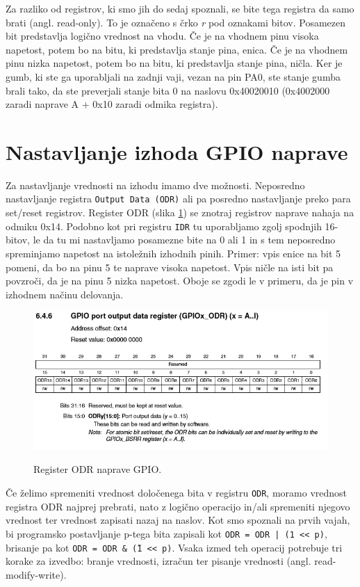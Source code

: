\documentclass[12pt,letterpaper]{article}
\begin{document}
Za razliko od registrov, ki smo jih do sedaj spoznali, se bite tega registra da samo brati (angl. read-only). To je označeno s črko \textit{r} pod oznakami bitov. Posamezen bit predstavlja logično vrednost na vhodu. Če je na vhodnem pinu visoka napetost, potem bo na bitu, ki predstavlja stanje pina, enica. Če je na vhodnem pinu nizka napetost, potem bo na bitu, ki predstavlja stanje pina, ničla. Ker je gumb, ki ste ga uporabljali na zadnji vaji, vezan na pin PA0, ste stanje gumba brali tako, da ste preverjali stanje bita 0 na naslovu 0x40020010 (0x4002000 zaradi naprave A + 0x10 zaradi odmika registra).


\section*{Nastavljanje izhoda GPIO naprave}

Za nastavljanje vrednosti na izhodu imamo dve možnosti. Neposredno nastavljanje registra \texttt{Output Data (ODR)} ali pa posredno nastavljanje preko para set/reset registrov. Register ODR (slika \ref{odr}) se znotraj registrov naprave nahaja na odmiku 0x14. Podobno kot pri registru \texttt{IDR} tu uporabljamo zgolj spodnjih 16-bitov, le da tu mi nastavljamo posamezne bite na 0 ali 1 in s tem neposredno spreminjamo napetost na istoležnih izhodnih pinih. Primer: vpis enice na bit 5 pomeni, da bo na pinu 5 te naprave visoka napetost. Vpis ničle na isti bit pa povzroči, da je na pinu 5 nizka napetost. Oboje se zgodi le v primeru, da je pin v izhodnem načinu delovanja.

\begin{figure}[ht!]
  \centering
  \caption{Register ODR naprave GPIO.}
  \includegraphics[width=350pt]{images/vaja3/odr.png}
  \label{odr}
\end{figure}

Če želimo spremeniti vrednost določenega bita v registru \texttt{ODR}, moramo vrednost registra ODR najprej prebrati, nato z logično operacijo in/ali spremeniti njegovo vrednost ter vrednost zapisati nazaj na naslov. Kot smo spoznali na prvih vajah, bi programsko postavljanje p-tega bita zapisali kot \texttt{ODR = ODR | (1 << p)}, brisanje pa kot \texttt{ODR = ODR \& \~(1 << p)}. Vsaka izmed teh operacij potrebuje tri korake za izvedbo: branje vrednosti, izračun ter pisanje vrednosti (angl. read-modify-write).
\end{document}
